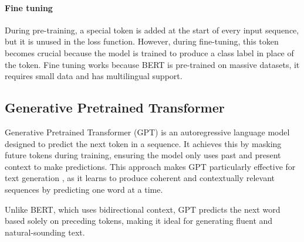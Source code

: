 \paragraph*{Fine tuning}
During pre-training, a special token is added at the start of every input sequence, but it is unused in the loss function. 
However, during fine-tuning, this token becomes crucial because the model is trained to produce a class label in place of the token.
Fine tuning works because BERT is pre-trained on massive datasets, it requires small data and has multilingual support. 

\subsection{Generative Pretrained Transformer}
Generative Pretrained Transformer (GPT) is an autoregressive language model designed to predict the next token in a sequence. 
It achieves this by masking future tokens during training, ensuring the model only uses past and present context to make predictions.
This approach makes GPT particularly effective for text generation , as it learns to produce coherent and contextually relevant sequences by predicting one word at a time.

Unlike BERT, which uses bidirectional context, GPT predicts the next word based solely on preceding tokens, making it ideal for generating fluent and natural-sounding text.